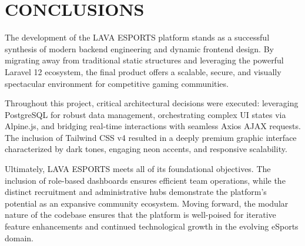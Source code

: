 \chapter{CONCLUSIONS}

The development of the LAVA ESPORTS platform stands as a successful synthesis of modern backend engineering and dynamic frontend design. By migrating away from traditional static structures and leveraging the powerful Laravel 12 ecosystem, the final product offers a scalable, secure, and visually spectacular environment for competitive gaming communities.

Throughout this project, critical architectural decisions were executed: leveraging PostgreSQL for robust data management, orchestrating complex UI states via Alpine.js, and bridging real-time interactions with seamless Axios AJAX requests. The inclusion of Tailwind CSS v4 resulted in a deeply premium graphic interface characterized by dark tones, engaging neon accents, and responsive scalability.

Ultimately, LAVA ESPORTS meets all of its foundational objectives. The inclusion of role-based dashboards ensures efficient team operations, while the distinct recruitment and administrative hubs demonstrate the platform's potential as an expansive community ecosystem. Moving forward, the modular nature of the codebase ensures that the platform is well-poised for iterative feature enhancements and continued technological growth in the evolving eSports domain.
